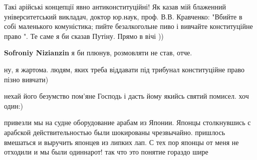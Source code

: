 \begin{itemize}
\begin{itemize}
Такі арійські концепції явно антиконституційні! Як казав мій блаженний
університетський викладач, доктор юр.наук, проф. В.В. Кравченко: "Вбийте в собі
маленького комуністика; пийте безалкогольне пиво і вивчайте конституційне право
". Те саме я би сказав Путіну. Прямо в вічі ))


 
\textbf{Sofroniy Nizianzin} я би плюнув, розмовляти не став, отче.

 
ну, я жартома. людям, яких треба віддавати під трибунал конституційне право пізно вивчати)

 
нехай його безумство пом'яне Господь і дасть йому якийсь святий помисел. хоч один:)

\end{itemize}

 

привезли мы на судне оборудование арабам из Японии. Японцы столкнувшись с
арабской действительностью были шокированы чрезвычайно. пришлось вмешаться и
выручить японцев из липких лап. С тех пор японцы от меня не отходили и мы были
одиннарот! так что это понятие гораздо шире


 


\end{itemize}
